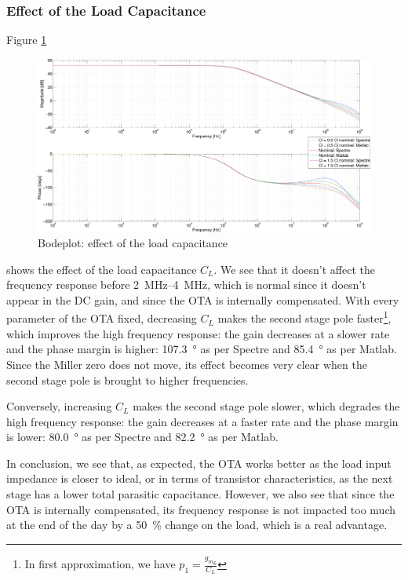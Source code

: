 \documentclass[english,10pt]{article}
\begin{document}
\subsubsection{Effect of the Load Capacitance}
Figure \ref{fig:cl}
\begin{figure}[htbp]
  \centering
  \includegraphics[width = \textwidth]{6_3.pdf}
  \caption{Bodeplot: effect of the load capacitance\label{fig:cl}}
\end{figure}
shows the effect of the load capacitance $C_L$. We see that it doesn't affect the frequency response before \SIrange{2}{4}{\mega\hertz}, which is normal since it doesn't appear in the DC gain, and since the OTA is internally compensated. With every parameter of the OTA fixed, decreasing $C_L$ makes the second stage pole faster\footnote{In first approximation, we have $p_1 = \frac{{g_m}_6}{C_L}$}, which improves the high frequency response: the gain decreases at a slower rate and the phase margin is higher: \SI{107.3}{\degree} as per Spectre and \SI{85.4}{\degree} as per Matlab. Since the Miller zero does not move, its effect becomes very clear when the second stage pole is brought to higher frequencies.

Conversely, increasing $C_L$ makes the second stage pole slower, which degrades the high frequency response: the gain decreases at a faster rate and the phase margin is lower: \SI{80.0}{\degree} as per Spectre and \SI{82.2}{\degree} as per Matlab.

In conclusion, we see that, as expected, the OTA works better as the load input impedance is closer to ideal, or in terms of transistor characteristics, as the next stage has a lower total parasitic capacitance. However, we also see that since the OTA is internally compensated, its frequency response is not impacted too much at the end of the day by a \SI{50}{\percent} change on the load, which is a real advantage.
\end{document}
